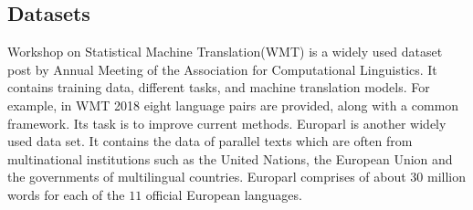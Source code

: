 \documentclass[a4paper, 12pt]{article}
\begin{document}
\subsection{Datasets}
Workshop on Statistical Machine Translation(WMT) is a widely used dataset post by Annual Meeting of the Association for Computational Linguistics. It contains training data, different tasks, and machine translation models. For example, in WMT 2018 eight language pairs are provided, along with a common framework. Its task is to improve current methods. Europarl is another widely used data set. It contains the data of parallel texts which are often from multinational institutions such as the United Nations, the European Union and the governments of multilingual countries. Europarl comprises of about 30 million words for each of the $11$ official European languages.
\end{document}
